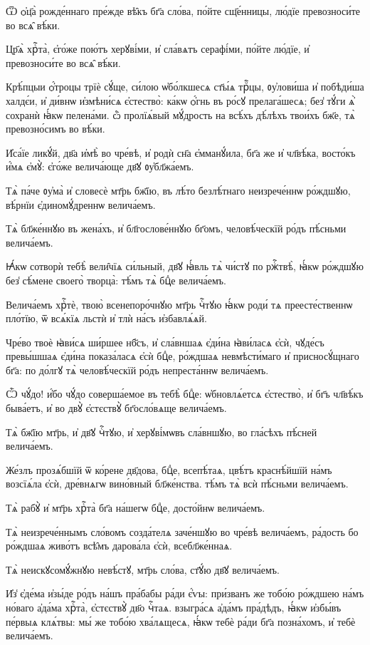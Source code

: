 \hKv Ѿ ѻ҆ц҃а̀ рожде́ннаго пре́жде вѣ̑къ бг҃а сло́ва, по́йте  сщ҃е́нницы, лю́дїе превозноси́те во всѧ̑ вѣ́ки. 

\hKv Цр҃ѧ̀ хрⷭ҇та̀, є҆го́же пою́тъ херꙋві́ми, и҆ сла́вѧтъ  серафі́ми, по́йте лю́дїе, и҆ превозноси́те во всѧ̑ вѣ́ки. 

\hKv Крѣ́пцыи ѻ҆́троцы трїѐ сꙋ́ще, си́лою ѡ҆бо́лкшесѧ ст҃ы́ѧ  трⷪ҇цы, ᲂу҆лови́ша и҆ побѣди́ша халдє́и, и҆ ди́внѡ  и҆змѣни́сѧ є҆стество̀: ка́кѡ ѻ҆́гнь въ ро́сꙋ  прелага́шесѧ; без̾ тꙋ́ги ѧ҆̀ сохранѝ ꙗ҆́кѡ пелена́ми. ѽ  пролїѧ́вый мꙋ́дрость на всѣ́хъ дѣ́лѣхъ твои́хъ бж҃е, тѧ̀  превозно́симъ во вѣ́ки. 
%

\hKv И҆са́їе ликꙋ́й, дв҃а и҆мѣ̀ во чре́вѣ, и҆ родѝ сн҃а  є҆мманꙋ́ила, бг҃а же и҆ чл҃вѣ́ка, восто́къ и҆́мѧ є҆мꙋ̀:  є҆го́же велича́юще дв҃ꙋ ᲂу҆бл҃жа́емъ.  
%

\hKv Тѧ̀ па́че ᲂу҆ма̀ и҆ словесѐ мт҃рь бж҃їю, въ  лѣ́то безлѣ́тнаго неизрече́ннѡ ро́ждшꙋю, вѣ́рнїи  є҆диномꙋ́дреннѡ велича́емъ. 
%

\hKv Тѧ̀ бл҃же́ннꙋю въ жена́хъ, и҆ бл҃гослове́ннꙋю бг҃омъ,  человѣ́ческїй ро́дъ пѣ́сньми велича́емъ. 

\hKv Ꙗ҆́кѡ сотворѝ тебѣ̀ вели̑чїѧ си́льный, дв҃ꙋ ꙗ҆́вль тѧ̀  чи́стꙋ по ржⷭ҇твѣ̀, ꙗ҆́кѡ ро́ждшꙋю без̾ сѣ́мене своего̀  творца̀: тѣ́мъ тѧ̀ бцⷣе велича́емъ. 

\hKv Велича́емъ хрⷭ҇тѐ, твою̀ всенепоро́чнꙋю мт҃рь чⷭ҇тꙋю ꙗ҆́кѡ  роди́ тѧ преесте́ственнѡ пло́тїю, ѿ всѧ́кїѧ льстѝ и҆ тлѝ  на́съ и҆збавлѧ́ѧй. 

\hKv Чре́во твоѐ ꙗ҆ви́сѧ ши́ршее нб҃съ, и҆ сла́вншаѧ є҆ди́на  ꙗ҆ви́ласѧ є҆сѝ, чꙋде́съ превы́шшаѧ є҆ди́на показа́ласѧ  є҆сѝ бцⷣе, ро́ждшаѧ невмѣсти́маго и҆ присносꙋ́щнаго  бг҃а: по до́лгꙋ тѧ̀ человѣ́ческїй ро́дъ непреста́ннѡ  велича́емъ.  

\hKv Ѽ чꙋ́до! и҆́бо чꙋ́до соверша́емое въ тебѣ̀ бцⷣе:  ѡ҆бновлѧ́етсѧ є҆стество̀, и҆ бг҃ъ чл҃вѣ́къ быва́етъ, и҆ во  двꙋ̀ є҆стєствꙋ̀ бг҃осло́вѧще велича́емъ. 

\hKv Тѧ̀ бж҃їю мт҃рь, и҆ дв҃ꙋ чⷭ҇тꙋю, и҆ херꙋві́мѡвъ сла́вншꙋю,  во гла́сѣхъ пѣ́сней велича́емъ. 

\hKv Же́злъ прозѧ́бшїй ѿ ко́рене дв҃дова, бцⷣе, всепѣ́таѧ,  цвѣ́тъ краснѣ́йшїй на́мъ возсїѧ́ла є҆сѝ, дре́внѧгѡ  вино́вный бл҃же́нства. тѣ́мъ тѧ̀ всѝ пѣ́сньми велича́емъ. 

\hKv Тѧ̀ рабꙋ̀ и҆ мт҃рь хрⷭ҇та̀ бг҃а на́шегѡ бцⷣе, досто́йнѡ  велича́емъ. 

\hKv Тѧ̀ неизрече́ннымъ сло́вомъ созда́телѧ заче́ншꙋю во чре́вѣ  велича́емъ, ра́дость бо ро́ждшаѧ живо́тъ всѣ̑мъ дарова́ла  є҆сѝ, всебл҃же́ннаѧ. 

\hKv Тѧ̀ неискꙋсомꙋ́жнꙋю невѣ́стꙋ, мт҃рь сло́ва, ст҃ꙋ́ю дв҃ꙋ  велича́емъ. 

\hKv И҆з̾ є҆де́ма и҆зы́де ро́дъ на́шъ пра́бабы ра́ди є҆́ѵы:  при́званъ же тобо́ю ро́ждшею на́мъ  но́ваго а҆да́ма хрⷭ҇та̀, є҆стєствꙋ̀ дв҃о чⷭ҇таѧ.  взыгра́сѧ а҆да́мъ пра́дѣдъ, ꙗ҆́кѡ и҆збы́въ пе́рвыѧ  клѧ́твы: мы́ же тобо́ю хва́лѧщесѧ, ꙗ҆́кѡ тебѐ ра́ди бг҃а  позна́хомъ, и҆ тебѐ велича́емъ.  
